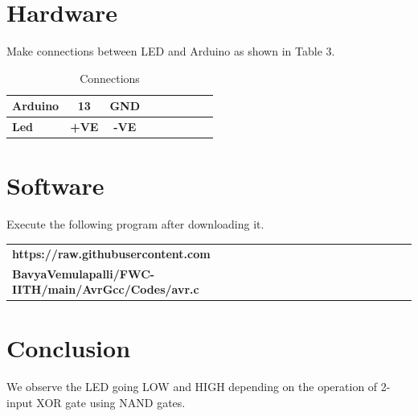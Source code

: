 \documentclass[10pt, a4paper]{article}
\begin{document}
\section{Hardware}

Make connections between LED and Arduino as shown in Table 3.

\begin{table}[H]
 \begin{center}
    \begin{tabular}{|l|c|c|c|c|c|c|c|c} \hline\textbf{Arduino} & \textbf{13} & \textbf{GND} \\ \hline
 \textbf{Led} & \textbf{+VE} & \textbf{-VE}\\ \hline
\end{tabular}   
\end{center}
\caption{Connections}
\label{table 3}
\end{table}


\section{Software}

Execute the following program after downloading it.

\begin{table}[H]
 \begin{center}
    \begin{tabular}{|l|c|c|c|c|c|c|c|c}\hline\textbf{https://raw.githubusercontent.com}\\
    \textbf{BavyaVemulapalli/FWC-IITH/main/AvrGcc/Codes/avr.c} \\ \hline
\end{tabular}   
\end{center}
\end{table}


\section{Conclusion}
We observe the LED going LOW and HIGH depending on the operation of 2-input XOR gate using NAND gates.
\end{document}
